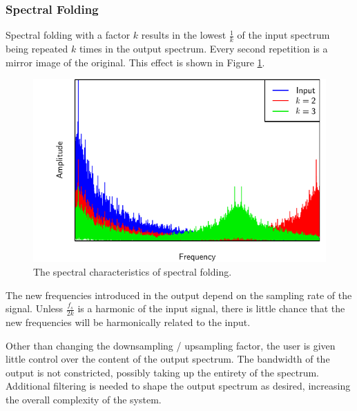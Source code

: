 		\subsubsection*{Spectral Folding}
			Spectral folding with a factor $k$ results in the lowest $\frac{1}{k}$ of the input spectrum being
			repeated $k$ times in the output spectrum. Every second repetition is a mirror image of the
			original. This effect is shown in Figure \ref{fig:SpectralFolding}. 
			
			\begin{figure}[h!]
				\centering
				\includegraphics{chapter5/Images/SpectralFoldingSpectrum.pdf}
				\caption{The spectral characteristics of spectral folding.}
				\label{fig:SpectralFolding}
			\end{figure}

			The new frequencies introduced in the output depend on the sampling rate of the signal. Unless
			$\frac{f_{s}}{2k}$ is a harmonic of the input signal, there is little chance that the new
			frequencies will be harmonically related to the input.

			Other than changing the downsampling / upsampling factor, the user is given little control over the
			content of the output spectrum. The bandwidth of the output is not constricted, possibly taking up
			the entirety of the spectrum. Additional filtering is needed to shape the output spectrum as
			desired, increasing the overall complexity of the system.

